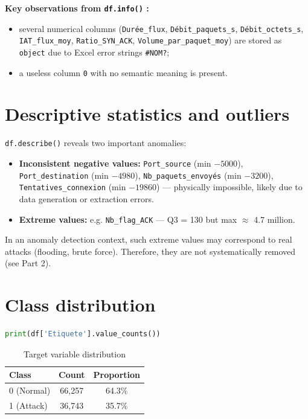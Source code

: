 \textbf{Key observations from \texttt{df.info()} :}
\begin{itemize}[leftmargin=*,itemsep=2pt]
    \item several numerical columns (\texttt{Durée\_flux}, \texttt{Débit\_paquets\_s}, \texttt{Débit\_octets\_s}, \texttt{IAT\_flux\_moy}, \texttt{Ratio\_SYN\_ACK}, \texttt{Volume\_par\_paquet\_moy}) are stored as \texttt{object} due to Excel error strings \texttt{\#NOM?};
    \item a useless column \texttt{0} with no semantic meaning is present.
\end{itemize}

\section{Descriptive statistics and outliers}

\texttt{df.describe()} reveals two important anomalies:

\begin{itemize}[leftmargin=*,itemsep=2pt]
    \item \textbf{Inconsistent negative values:} \texttt{Port\_source} (min $-5000$), \texttt{Port\_destination} (min $-4980$), \texttt{Nb\_paquets\_envoyés} (min $-3200$), \texttt{Tentatives\_connexion} (min $-19860$) — physically impossible, likely due to data generation or extraction errors.
    \item \textbf{Extreme values:} e.g. \texttt{Nb\_flag\_ACK} — Q3 = 130 but max $\approx$ 4.7 million.
\end{itemize}

In an anomaly detection context, such extreme values may correspond to real attacks (flooding, brute force). Therefore, they are not systematically removed (see Part 2).

\section{Class distribution}

\begin{lstlisting}[language=Python]
print(df['Etiquete'].value_counts())
\end{lstlisting}

\begin{table}[H]
\centering
\caption{Target variable distribution}
\begin{tabular}{lcc}
\toprule
\textbf{Class} & \textbf{Count} & \textbf{Proportion} \\
\midrule
0 (Normal) & 66,257 & 64.3\% \\
1 (Attack) & 36,743 & 35.7\% \\
\bottomrule
\end{tabular}
\end{table}

